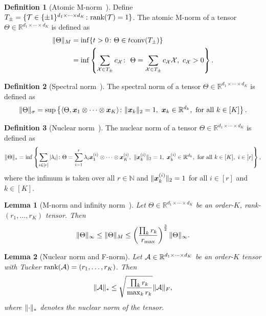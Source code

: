 \documentclass{article}
\theoremstyle{plain}
\newtheorem{lem}{Lemma}
\theoremstyle{definition}
\newtheorem{defn}{Definition}
\begin{document}
\begin{defn}[Atomic M-norm~\citep{ghadermarzy2019near}]
Define $T_{\pm}=\{\mathcal{T}\in\{\pm 1 \}^{d_1\times \cdots \times d_K}\colon \text{rank}(\mathcal{T})=1\}$. The atomic M-norm of a tensor $\Theta\in\mathbb{R}^{d_1\times \cdots \times d_K}$ is defined as
\begin{align}
\anormSize{}{\Theta}&=\inf\{t>0\colon \Theta\in t\text{conv}(T_{\pm})\}\\
&=\inf\left\{\sum_{\tX\in T_{\pm}}c_{\tX} \colon\ \Theta=\sum_{\tX\in T_{\pm}} c_{\tX}\tX, \ c_{\tX}>0\right\}.
\end{align}
\end{defn}

\begin{defn}[Spectral norm~\citep{lim2005singular}]
The spectral norm of a tensor $\Theta\in\mathbb{R}^{d_1\times \cdots \times d_K}$ is defined as
\[
\snormSize{}{\Theta}=\sup\left\{\langle \Theta, \mx_1\otimes \cdots \otimes \mx_K\rangle \colon \vnormSize{}{\mx_k}=1,\ \mx_k\in\mathbb{R}^{d_k},\ \text{for all}\ k\in[K]\right\}.
\]
\end{defn}

\begin{defn}[Nuclear norm~\citep{friedland2018nuclear}]
The nuclear norm of a tensor $\Theta\in\mathbb{R}^{d_1\times \cdots \times d_K}$ is defined as
\[
\nnormSize{}{\Theta}=\inf
\left\{
\sum_{i\in[r]}|\lambda_i|\colon \Theta=\sum_{i=1}^r \lambda_i\mx^{(i)}_1\otimes \cdots \otimes \mx^{(i)}_K,\ \vnormSize{}{\mx^{(i)}_k}=1,\ \mx^{(i)}_k\in\mathbb{R}^{d_k},\ \text{for all}\ k\in[K],\ i\in[r]
\right\},
\]
where the infimum is taken over all $r\in\mathbb{N}$ and $\lVert\bm x^{(i)}_k\rVert_2=1$ for all $i\in[r]$ and $k\in[K]$.
\end{defn}



\begin{lem}[M-norm and infinity norm~\citep{ghadermarzy2019near}]\label{lem:Mnormbound}
Let $\Theta\in\mathbb{R}^{d_1\times \cdots \times d_K}$ be an order-$K$, rank-$(r_1,\ldots,r_K)$ tensor. Then
\[
\lVert\Theta\rVert_\infty\leq \lVert\Theta\rVert_M\leq \left(\prod_k r_k \over r_{\max}\right)^{3\over 2} \lVert\Theta\rVert_\infty.
\]
\end{lem}


\begin{lem}[Nuclear norm and F-norm] \label{lem:nuclear}
Let $\mathcal{A}\in\mathbb{R}^{d_1\times\cdots\times d_K}$ be an order-$K$ tensor with Tucker $\text{rank}(\mathcal{A})=(r_1,\ldots,r_K)$. Then
\[
\lVert\mathcal{A}\rVert_* \leq \sqrt{\prod_k r_k\over \max_k r_k} \lVert\mathcal{A}\rVert_F,
\]
where $\lVert\cdot\rVert_*$ denotes the nuclear norm of the tensor.
\end{lem}
\end{document}

